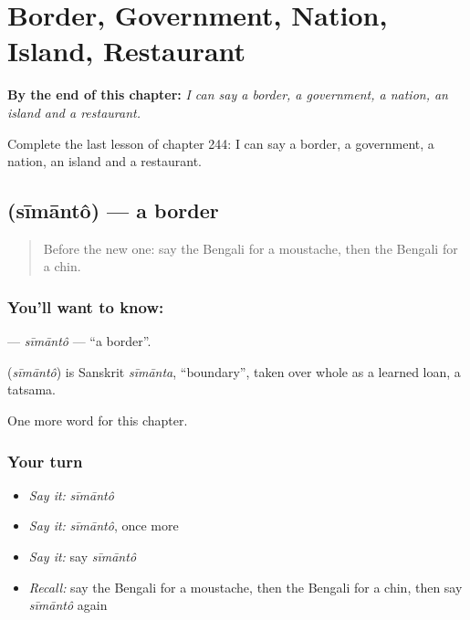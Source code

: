 
\chapter{Border, Government, Nation, Island, Restaurant}
\label{ch:bn-border-government-nation-island-restaurant}

\begin{chapteropening}
\textbf{By the end of this chapter:} \emph{I can say a border, a government, a nation, an island and a restaurant.}

Complete the last lesson of chapter 244: I can say a border, a government, a nation, an island and a restaurant.
\end{chapteropening}

\section[\texorpdfstring{\bn{সীমান্ত} (sīmāntô)}{সীমান্ত (sīmāntô)}]{ (sīmāntô) — a border}

\label{lesson:BN-C244-simanto}



\begin{quote}
Before the new one: say the Bengali for a moustache, then the Bengali for a chin.
\end{quote}

\subsection*{You'll want to know: }
\textbf{} — \emph{sīmāntô} — \textquotedblleft{}a border\textquotedblright{}.

\begin{cousinweb}
\textbf{} (\emph{sīmāntô}) is Sanskrit \emph{sīmānta}, \textquotedblleft{}boundary\textquotedblright{}, taken over whole as a learned loan, a tatsama.
\end{cousinweb}

\begin{grammarlens}[title={What you've built}]
One more word for this chapter.
\end{grammarlens}

\subsection*{Your turn}
\begin{itemize}
\raggedright
  \item \emph{Say it:} \emph{sīmāntô}
  \item \emph{Say it:} \emph{sīmāntô}, once more
  \item \emph{Say it:} say \emph{sīmāntô}
  \item \emph{Recall:} say the Bengali for a moustache, then the Bengali for a chin, then say \emph{sīmāntô} again
\end{itemize}

